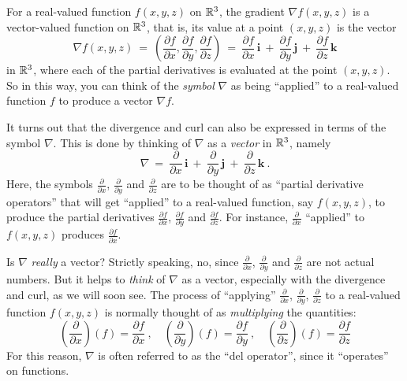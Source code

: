For a real-valued function $f(x,y,z)$ on $\mathbb{R}^{3}$, the gradient $\nabla f(x,y,z)$ is a vector-valued function on
$\mathbb{R}^{3}$, that is, its value at a point $(x,y,z)$ is the vector
\begin{displaymath}
 \nabla f(x,y,z) ~=~ \left( \frac{\partial f}{\partial x},\frac{\partial f}{\partial y},\frac{\partial f}{\partial z}
  \right) ~=~
 \frac{\partial f}{\partial x}\,\textbf{i} ~+~ \frac{\partial f}{\partial y}\,\textbf{j} ~+~
 \frac{\partial f}{\partial z}\,\textbf{k}
\end{displaymath}
in $\mathbb{R}^{3}$, where each of the partial derivatives is evaluated at the point $(x,y,z)$. So in this way, you can think
of the \emph{symbol} $\nabla$ as being ``applied'' to a real-valued function $f$ to produce a vector $\nabla f$.

It turns out that the divergence and curl can also be expressed in terms of the symbol $\nabla$. This is done by
thinking of $\nabla$ as a \emph{vector} in $\mathbb{R}^{3}$, namely\index{$\nabla$}
\begin{equation}\label{eqn:del}
 \nabla ~=~ \frac{\partial}{\partial x}\,\textbf{i} ~+~ \frac{\partial}{\partial y}\,\textbf{j} ~+~
   \frac{\partial}{\partial z}\,\textbf{k} ~.
\end{equation}
Here, the symbols $\frac{\partial}{\partial x}$, $ \frac{\partial}{\partial y}$ and $\frac{\partial}{\partial z}$ are to
be thought of as ``partial derivative operators'' that will get ``applied'' to a real-valued function, say $f(x,y,z)$,
to produce the partial derivatives $\frac{\partial f}{\partial x}$, $\frac{\partial f}{\partial y}$ and
$\frac{\partial f}{\partial z}$. For instance, $\frac{\partial}{\partial x}$ ``applied'' to $f(x,y,z)$ produces
$\frac{\partial f}{\partial x}$.

Is $\nabla$ \emph{really} a vector? Strictly speaking, no, since $\frac{\partial}{\partial x}$,
$\frac{\partial}{\partial y}$ and $\frac{\partial}{\partial z}$ are not actual numbers. But it helps to
\emph{think} of $\nabla$ as a vector, especially with the divergence and curl, as we will soon see. The process of
``applying'' $\frac{\partial}{\partial x}$, $\frac{\partial}{\partial y}$, $\frac{\partial}{\partial z}$ to a
real-valued function $f(x,y,z)$ is normally thought of as \emph{multiplying} the quantities:
\begin{displaymath}
 \left( \frac{\partial}{\partial x} \right) (f) = \frac{\partial f}{\partial x} ~,\quad
 \left( \frac{\partial}{\partial y} \right) (f) = \frac{\partial f}{\partial y} ~,\quad
 \left( \frac{\partial}{\partial z} \right) (f) = \frac{\partial f}{\partial z}
\end{displaymath}
For this reason, $\nabla$ is often referred to as the ``del operator'', since it ``operates'' on functions.
 
